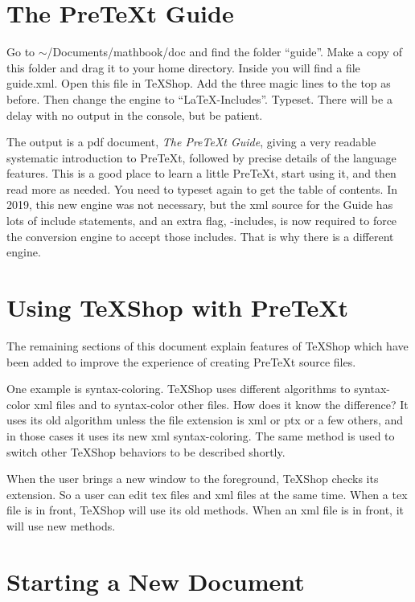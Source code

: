 \documentclass[11pt, oneside]{article}   	%
\begin{document}
\section{The PreTeXt Guide}

Go to $\sim$/Documents/mathbook/doc and find the folder ``guide''. Make a copy of this folder and drag it to your home directory. Inside you will find a file guide.xml. Open this file in TeXShop. Add the three magic lines to the top as before. Then change the engine to
``LaTeX-Includes''. Typeset. There will be a delay with no output in the console, but be patient. 

The output is a  pdf document, {\em The PreTeXt Guide}, giving a very readable systematic introduction to PreTeXt, followed by precise details of the language features. This is a good place to learn a little PreTeXt, start using it, and then read more as needed. You need to typeset again to get the table of contents. In 2019, this new engine was not necessary, but the xml source for the Guide has lots of include statements, and an extra flag, -includes, is now required to force the conversion engine to accept those includes. That is why there is a different engine.


\section{Using TeXShop with PreTeXt}

The remaining sections of this document explain features of TeXShop which have been added to improve the experience of creating PreTeXt source files. 

One example is syntax-coloring. TeXShop uses different algorithms to syntax-color xml files and to syntax-color other files. How does it know the difference? It uses its old algorithm unless the file extension is xml or ptx or a few others, and in those cases it uses its new xml syntax-coloring. The same method is used to switch  other TeXShop behaviors to be described shortly.

When the user brings a new window to the foreground, TeXShop checks its extension. So a user can edit tex files and xml files at the same time. When a tex file is in front, TeXShop will use its old methods. When an xml file is in front, it will use new methods.

\section{Starting a New Document}
\end{document}
